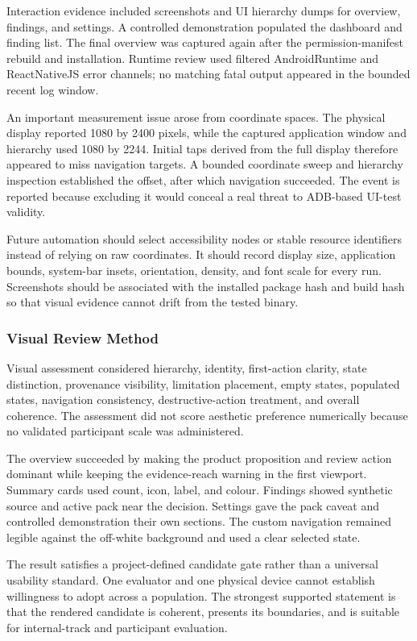 Interaction evidence included screenshots and UI hierarchy dumps for overview, findings, and settings. A controlled demonstration populated the dashboard and finding list. The final overview was captured again after the permission-manifest rebuild and installation. Runtime review used filtered AndroidRuntime and ReactNativeJS error channels; no matching fatal output appeared in the bounded recent log window.

An important measurement issue arose from coordinate spaces. The physical display reported 1080 by 2400 pixels, while the captured application window and hierarchy used 1080 by 2244. Initial taps derived from the full display therefore appeared to miss navigation targets. A bounded coordinate sweep and hierarchy inspection established the offset, after which navigation succeeded. The event is reported because excluding it would conceal a real threat to ADB-based UI-test validity.

Future automation should select accessibility nodes or stable resource identifiers instead of relying on raw coordinates. It should record display size, application bounds, system-bar insets, orientation, density, and font scale for every run. Screenshots should be associated with the installed package hash and build hash so that visual evidence cannot drift from the tested binary.

\subsubsection{Visual Review Method}

Visual assessment considered hierarchy, identity, first-action clarity, state distinction, provenance visibility, limitation placement, empty states, populated states, navigation consistency, destructive-action treatment, and overall coherence. The assessment did not score aesthetic preference numerically because no validated participant scale was administered.

The overview succeeded by making the product proposition and review action dominant while keeping the evidence-reach warning in the first viewport. Summary cards used count, icon, label, and colour. Findings showed synthetic source and active pack near the decision. Settings gave the pack caveat and controlled demonstration their own sections. The custom navigation remained legible against the off-white background and used a clear selected state.

The result satisfies a project-defined candidate gate rather than a universal usability standard. One evaluator and one physical device cannot establish willingness to adopt across a population. The strongest supported statement is that the rendered candidate is coherent, presents its boundaries, and is suitable for internal-track and participant evaluation.

